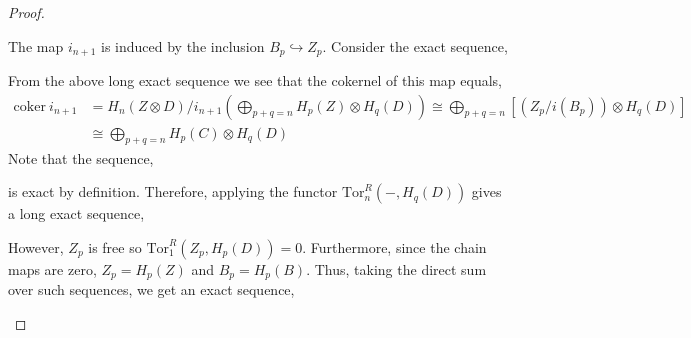 \documentclass[12pt]{extarticle}
\newcommand{\coker}[1]{\mathrm{coker}\: #1}
\theoremstyle{definition}
\newcommand{\Tor}[4]{\mathrm{Tor}^{#1}_{#2} \left( #3, #4 \right)}
\begin{document}
\begin{proof}
\begin{center}
\end{center}
The map $i_{n+1}$ is induced by the inclusion $B_p \hookrightarrow Z_p$. Consider the exact sequence,
\begin{center}
\end{center}
From the above long exact sequence we see that the cokernel of this map equals,
\begin{align*}
\coker{i_{n+1}} & = H_n(Z \otimes D) / i_{n+1}\left( \bigoplus\limits_{p+q = n} H_p(Z) \otimes H_q(D) \right) \cong  \bigoplus\limits_{p+q = n} \left[ \left( Z_p / i(B_p) \right) \otimes H_q(D) \right] 
\\
& \cong \bigoplus\limits_{p+q = n} H_p(C) \otimes H_q(D)
\end{align*}
Note that the sequence,
\begin{center}
\end{center}
is exact by definition. Therefore, applying the functor $\Tor{R}{n}{-}{H_q(D)}$ gives a long exact sequence,
\begin{center}
\end{center}
However, $Z_p$ is free so $\Tor{R}{1}{Z_p}{H_p(D)} = 0$. Furthermore, since the chain maps are zero, $Z_p = H_p(Z)$ and $B_p = H_p(B)$. Thus, taking the direct sum over such sequences, we get an exact sequence,
\begin{center}
\end{center}
\end{proof}
\end{document}
